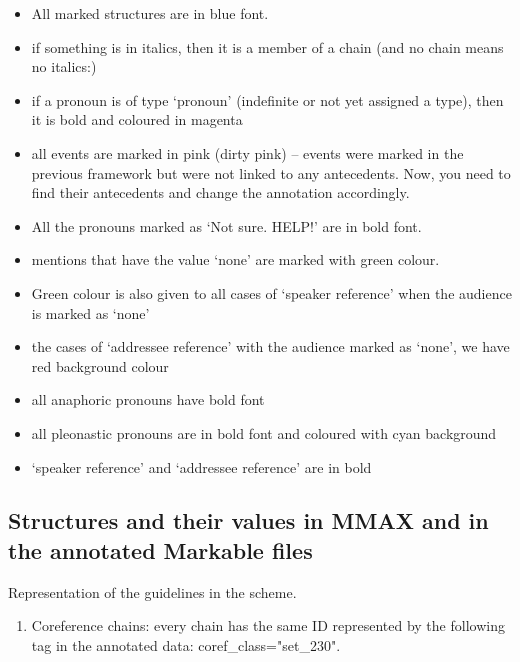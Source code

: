 \documentclass[a4paper]{article}
\begin{document}
{{\begin{itemize}
\item All marked structures are in blue font. %
\item if something is in italics, then it is a member of a chain (and no chain means no italics:)
\item if a pronoun is of type `pronoun' (indefinite or not yet assigned a type), then it is bold and coloured in magenta %
\item all events are marked in pink (dirty pink) -- events were marked in the previous framework but were not linked to any antecedents. Now, you need to find their antecedents and change the annotation accordingly. %
\item All the pronouns marked as `Not sure. HELP!' are in bold font. %
\item mentions that have the value `none' are marked with green colour. %
 \item Green colour is also given to all cases of `speaker reference' when the audience is marked as `none' %
\item the cases of `addressee reference' with the audience marked as `none', we have red background colour %
\item all anaphoric pronouns have bold font %
\item all pleonastic pronouns are in bold font and coloured with cyan background %
\item `speaker reference' and `addressee reference' are in bold
\end{itemize}

\subsection{Structures and their values in MMAX and in the annotated Markable files}
Representation of the guidelines in the scheme.

\begin{enumerate}

\item Coreference chains: every chain has the same ID represented by the following tag in the annotated data: coref\_class="set\_230".


\end{enumerate}}}
\end{document}
